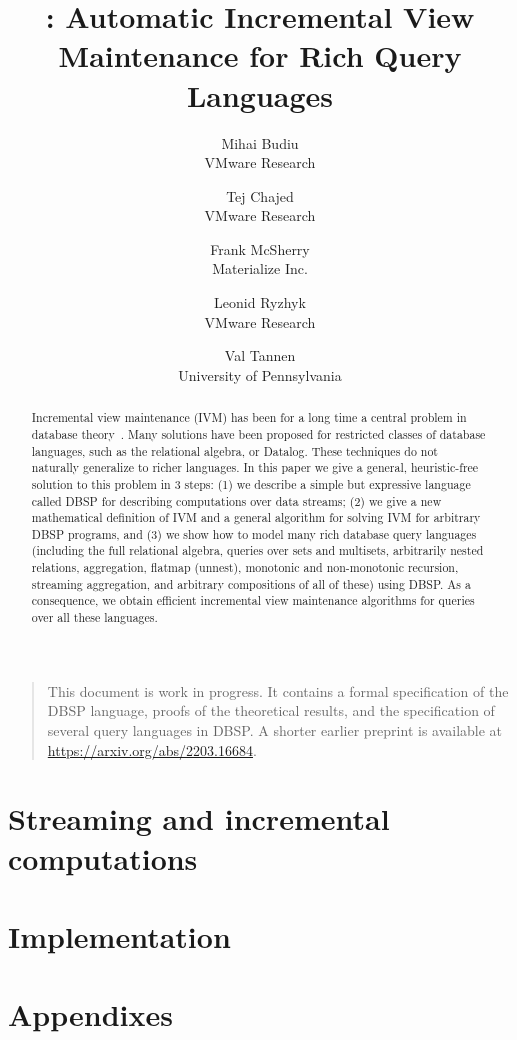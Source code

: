 \documentclass[10pt]{article}
\title{\dbsp: Automatic Incremental View Maintenance for Rich Query
Languages}
\author{
  Mihai Budiu \\ VMware Research \and
  Tej Chajed \\ VMware Research \and
Frank McSherry \\ Materialize Inc. \and
Leonid Ryzhyk \\ VMware Research \and
Val Tannen \\ University of Pennsylvania
}
\theoremstyle{definition}
\newcommand{\dbsp}{DBSP\xspace}
\begin{document}
\maketitle

\begin{abstract}
Incremental view maintenance (IVM) has been for a long time a central problem in database theory~\cite{gupta-idb95}.
Many solutions have been proposed for restricted classes of database languages,
such as the relational algebra, or Datalog.  These techniques do not naturally generalize to
richer languages.  In this paper we give a general, heuristic-free
solution to this problem in 3 steps: (1) we describe a simple but expressive language
called \dbsp for describing computations over data streams; (2) we give a new mathematical definition of IVM and
a general algorithm for solving IVM for arbitrary \dbsp programs, and (3) we show
how to model many rich database query languages (including the full relational algebra, queries over
sets and multisets, arbitrarily nested relations, aggregation, flatmap (unnest), monotonic and non-monotonic
recursion, streaming aggregation, and arbitrary compositions of all of these) using \dbsp.
As a consequence, we obtain efficient
incremental view maintenance algorithms for queries over all these languages.
\end{abstract}

\begin{quote}
This document is work in progress.  It contains a formal specification
of the \dbsp language, proofs of the theoretical results, and the
specification of several query languages in \dbsp.  A shorter earlier
preprint is available at \url{https://arxiv.org/abs/2203.16684}.
\end{quote}

\tableofcontents




\part{Streaming and incremental computations}









\part{Implementation}




\part{Appendixes}
\appendix


\printindex



\end{document}
